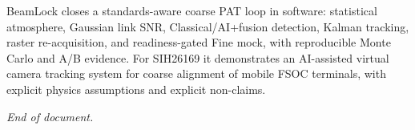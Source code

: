 \documentclass[11pt,a4paper]{article}
\begin{document}
BeamLock closes a standards-aware coarse PAT loop in software: statistical atmosphere, Gaussian link SNR, Classical/AI+fusion detection, Kalman tracking, raster re-acquisition, and readiness-gated Fine mock, with reproducible Monte Carlo and A/B evidence.
For SIH26169 it demonstrates an AI-assisted virtual camera tracking system for coarse alignment of mobile FSOC terminals, with explicit physics assumptions and explicit non-claims.

\vspace{1.5em}
\noindent\textit{End of document.}
\end{document}
